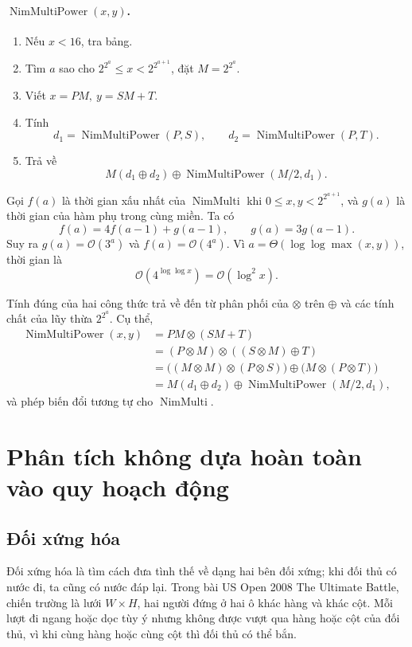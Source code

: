 \documentclass[11pt]{article}
\newcommand{\Oh}{\mathcal{O}}
\newcommand{\xor}{\oplus}
\newcommand{\nimprod}{\otimes}
\begin{document}
\paragraph{\(\operatorname{NimMultiPower}(x,y)\).}
\begin{enumerate}
  \item Nếu \(x<16\), tra bảng.
  \item Tìm \(a\) sao cho \(2^{2^a}\le x<2^{2^{a+1}}\), đặt \(M=2^{2^a}\).
  \item Viết \(x=PM,\ y=SM+T\).
  \item Tính
  \[
    d_1=\operatorname{NimMultiPower}(P,S),\qquad
    d_2=\operatorname{NimMultiPower}(P,T).
  \]
  \item Trả về
  \[
    M(d_1\xor d_2)\xor\operatorname{NimMultiPower}(M/2,d_1).
  \]
\end{enumerate}

Gọi \(f(a)\) là thời gian xấu nhất của \(\operatorname{NimMulti}\) khi
\(0\le x,y<2^{2^{a+1}}\), và \(g(a)\) là thời gian của hàm phụ trong cùng miền.
Ta có
\[
  f(a)=4f(a-1)+g(a-1),\qquad g(a)=3g(a-1).
\]
Suy ra \(g(a)=\Oh(3^a)\) và \(f(a)=\Oh(4^a)\). Vì
\(a=\Theta(\log\log\max(x,y))\), thời gian là
\[
  \Oh(4^{\log\log x})=\Oh(\log^2 x).
\]

Tính đúng của hai công thức trả về đến từ phân phối của \(\nimprod\) trên
\(\xor\) và các tính chất của lũy thừa \(2^{2^a}\). Cụ thể,
\[
\begin{aligned}
\operatorname{NimMultiPower}(x,y)
&=PM\nimprod(SM+T)\\
&=(P\nimprod M)\nimprod((S\nimprod M)\xor T)\\
&=\bigl((M\nimprod M)\nimprod(P\nimprod S)\bigr)
  \xor \bigl(M\nimprod(P\nimprod T)\bigr)\\
&=M(d_1\xor d_2)\xor \operatorname{NimMultiPower}(M/2,d_1),
\end{aligned}
\]
và phép biến đổi tương tự cho \(\operatorname{NimMulti}\).

\section{Phân tích không dựa hoàn toàn vào quy hoạch động}

\subsection{Đối xứng hóa}

Đối xứng hóa là tìm cách đưa tình thế về dạng hai bên đối xứng; khi đối thủ có
nước đi, ta cũng có nước đáp lại. Trong bài US Open 2008 The Ultimate Battle,
chiến trường là lưới \(W\times H\), hai người đứng ở hai ô khác hàng và khác
cột. Mỗi lượt đi ngang hoặc dọc tùy ý nhưng không được vượt qua hàng hoặc cột
của đối thủ, vì khi cùng hàng hoặc cùng cột thì đối thủ có thể bắn.
\end{document}
